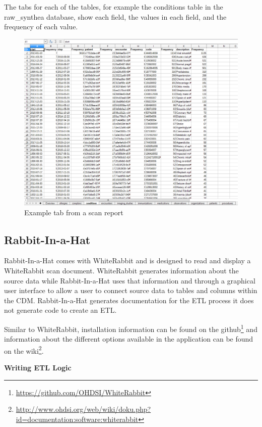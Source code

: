 \documentclass[11pt]{book}
\let\rmarkdownfootnote\footnote%
\def\footnote{\protect\rmarkdownfootnote}
\theoremstyle{definition}
\theoremstyle{definition}
\theoremstyle{definition}
\theoremstyle{remark}
\begin{document}
The tabs for each of the tables, for example the conditions table in the raw\_synthea database, show each field, the values in each field, and the frequency of each value.

\begin{figure}
\includegraphics[width=1\linewidth]{images/ExtractTransformLoad/ScanConditionsTab} \caption{Example tab from a scan report}\label{fig:ScanConditionsTab}
\end{figure}

\hypertarget{rabbit-in-a-hat}{%
\subsection{Rabbit-In-a-Hat}\label{rabbit-in-a-hat}}

Rabbit-In-a-Hat comes with WhiteRabbit and is designed to read and display a WhiteRabbit scan document. WhiteRabbit generates information about the source data while Rabbit-In-a-Hat uses that information and through a graphical user interface to allow a user to connect source data to tables and columns within the CDM. Rabbit-In-a-Hat generates documentation for the ETL process it does not generate code to create an ETL.

Similar to WhiteRabbit, installation information can be found on the github\footnote{\url{https://github.com/OHDSI/WhiteRabbit}} and information about the different options available in the application can be found on the wiki\footnote{\url{http://www.ohdsi.org/web/wiki/doku.php?id=documentation:software:whiterabbit}}.

\textbf{Writing ETL Logic}
\end{document}
